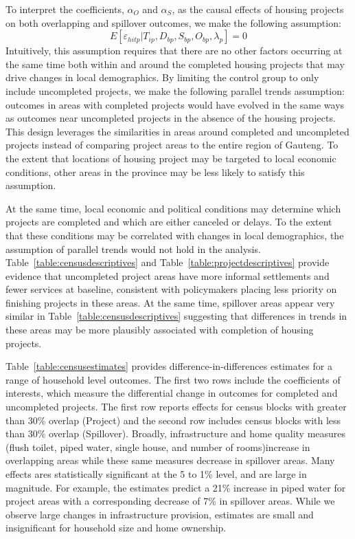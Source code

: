 \documentclass[12pt]{article}
\begin{document}
To interpret the coefficients, $\alpha_O$ and $\alpha_S$, as the causal effects of housing projects on both overlapping and spillover outcomes, we make the following assumption:
\begin{equation*}
E[\varepsilon_{hitp}|T_{ip},D_{bp},S_{bp},O_{bp},\lambda_p]=0
\end{equation*}
Intuitively, this assumption requires that there are no other factors occurring at the same time both within and around the completed housing projects that may drive changes in local demographics.  By limiting the control group to only include uncompleted projects, we make the following parallel trends assumption: outcomes in areas with completed projects would have evolved in the same ways as outcomes near uncompleted projects in the absence of the housing projects.  This design leverages the similarities in areas around completed and uncompleted projects instead of comparing project areas to the entire region of Gauteng.  To the extent that locations of housing project may be targeted to local economic conditions, other areas in the province may be less likely to satisfy this assumption.  

At the same time, local economic and political conditions may determine which projects are completed and which are either canceled or delays.  To the extent that these conditions may be correlated with changes in local demographics, the assumption of parallel trends would not hold in the analysis.  Table~\ref{table:censusdescriptives} and Table~\ref{table:projectdescriptives} provide evidence that uncompleted project areas have more informal settlements and fewer services at baseline, consistent with policymakers placing less priority on finishing projects in these areas.  At the same time, spillover areas appear very similar in Table~\ref{table:censusdescriptives} suggesting that differences in trends in these areas may be more plausibly associated with completion of housing projects.  

Table~\ref{table:censusestimates} provides difference-in-differences estimates for a range of household level outcomes.  The first two rows include the coefficients of interests, which measure the differential change in outcomes for completed and uncompleted projects.  The first row reports effects for census blocks with greater than 30\% overlap (Project) and the second row includes census blocks with less than 30\% overlap (Spillover).  Broadly, infrastructure and home quality measures (flush toilet, piped water, single house, and number of rooms)increase in overlapping areas while these same measures decrease in spillover areas.  Many effects ares statistically significant at the 5 to 1\% level, and are large in magnitude.  For example, the estimates predict a 21\% increase in piped water for project areas with a corresponding decrease of 7\% in spillover areas.  While we observe large changes in infrastructure provision, estimates are small and insignificant for household size and home ownership.
\end{document}
